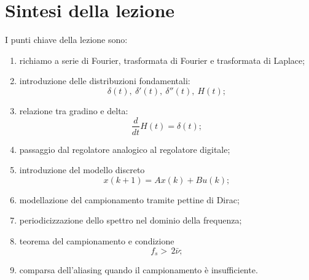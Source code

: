 \section{Sintesi della lezione}

I punti chiave della lezione sono:
\begin{enumerate}
    \item richiamo a serie di Fourier, trasformata di Fourier e trasformata di Laplace;
    \item introduzione delle distribuzioni fondamentali:
    \[
    \delta(t),\ \delta'(t),\ \delta''(t),\ H(t);
    \]
    \item relazione tra gradino e delta:
    \[
    \frac{d}{dt}H(t)=\delta(t);
    \]
    \item passaggio dal regolatore analogico al regolatore digitale;
    \item introduzione del modello discreto
    \[
    x(k+1)=Ax(k)+Bu(k);
    \]
    \item modellazione del campionamento tramite pettine di Dirac;
    \item periodicizzazione dello spettro nel dominio della frequenza;
    \item teorema del campionamento e condizione
    \[
    f_s>\,2\bar{\nu};
    \]
    \item comparsa dell'aliasing quando il campionamento è insufficiente.
\end{enumerate}